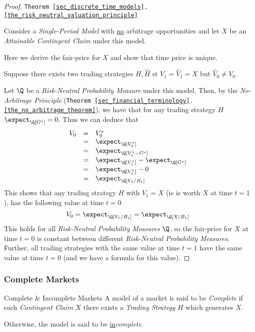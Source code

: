\documentclass[11pt,a4paper]{article}
\begin{document}
  \begin{proof}{\texttt{Theorem \ref{sec_discrete_time_models}.\ref{the_risk_neutral_valuation_principle}}}\label{prf_risk_neutral_valuation_principle}
    \par Consider a \textit{Single-Period Model} with \underline{no} arbitrage opportunities and let $X$ be an \textit{Attainable Contingent Claim} under this model.
    \par Here we derive the fair-price for $X$ and show that time price is unique.
    \par Suppose there exists two trading strategies $H,\hat{H}$ st $V_1=\hat{V}_1=X$ but $\hat{V}_0\neq V_0$.
    \par Let $\Q$ be a \textit{Risk-Neutral Probability Measure} under this model. Then, by the \textit{No-Arbitrage Principle} (\texttt{Theorem \ref{sec_financial_terminology}.\ref{the_no_arbitrage_theorem}}), we have that for any trading strategy $H$ $\expect_\Q[G^*]=0$. Thus we can deduce that
    \[\begin{array}{rcl}
      V_0&=&V_0^*\\
      &=&\expect_\Q[V_0^*]\\
      &=&\expect_\Q[V_1^*-G^*]\\
      &=&\expect_\Q[V_1^*]-\expect_\Q[G^*]\\
      &=&\expect_\Q[V_1^*]-0\\
      &=&\expect_\Q[V_1/B_1]
    \end{array}\]
    This shows that any trading strategy $H$ with $V_1=X$ (ie is worth $X$ at time $t=1$), has the following value at time $t=0$
    \[ V_0=\expect_\Q[V_1/B_1]=\expect_\Q[X/B_1] \]
    This holds for all \textit{Risk-Neutral Probability Measures} $\Q$, so the fair-price for $X$ at time $t=0$ is constant between different \textit{Risk-Neutral Probability Measures}. Further, all trading strategies with the same value at time $t=1$ have the same value at time $t=0$ (and we have a formula for this value).\proved
  \end{proof}

\subsubsection{Complete Markets}

  \begin{definition}{Complete \& Incomplete Markets}
    A model of a market is said to be \textit{Complete} if each \textit{Contingent Claim} $X$ there exists a \textit{Trading Strategy} $H$ which generates $X$.
    \par Otherwise, the model is said to be \underline{in}\textit{complete}.
  \end{definition}
\end{document}
